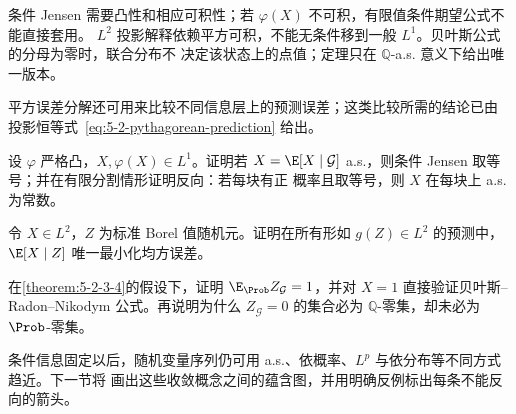 条件 Jensen 需要凸性和相应可积性；若 $\varphi(X)$ 不可积，有限值条件期望公式不能直接套用。
$L^2$ 投影解释依赖平方可积，不能无条件移到一般 $L^1$。贝叶斯公式的分母为零时，联合分布不
决定该状态上的点值；定理只在 $\mathbb Q$-a.s. 意义下给出唯一版本。

平方误差分解还可用来比较不同信息层上的预测误差；这类比较所需的结论已由
投影恒等式~\eqref{eq:5-2-pythagorean-prediction} 给出。

\begin{exercise}
设 $\varphi$ 严格凸，$X,\varphi(X)\in L^1$。证明若
$X=\E[X\mid\mathcal G]$ a.s.，则条件 Jensen 取等号；并在有限分割情形证明反向：若每块有正
概率且取等号，则 $X$ 在每块上 a.s. 为常数。
\end{exercise}

\begin{exercise}[最小均方预测]
令 $X\in L^2$，$Z$ 为标准 Borel 值随机元。证明在所有形如 $g(Z)\in L^2$ 的预测中，
$\E[X\mid Z]$ 唯一最小化均方误差。
\end{exercise}

\begin{exercise}[换测度的塔式检查]
在\cref{theorem:5-2-3-4}的假设下，证明
$\E_\Prob Z_{\mathcal G}=1$，并对 $X=1$ 直接验证贝叶斯--Radon--Nikodym 公式。再说明为什么
$Z_{\mathcal G}=0$ 的集合必为 $\mathbb Q$-零集，却未必为 $\Prob$-零集。
\end{exercise}

条件信息固定以后，随机变量序列仍可用 a.s.、依概率、$L^p$ 与依分布等不同方式趋近。下一节将
画出这些收敛概念之间的蕴含图，并用明确反例标出每条不能反向的箭头。
